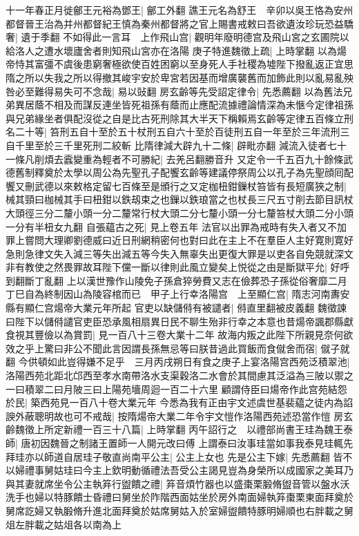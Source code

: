 十一年春正月徙鄶王元裕為鄧王|{
	鄶工外翻}
譙王元名為舒王　辛卯以吳王恪為安州都督晉王治為并州都督紀王慎為秦州都督將之官上賜書戒敕曰吾欲遺汝珍玩恐益驕奢|{
	遺于季翻}
不如得此一言耳　上作飛山宫|{
	觀明年廢明德宫及飛山宮之玄圃院以給洛人之遭水壞廬舍者則知飛山宮亦在洛陽}
庚子特進魏徵上疏|{
	上時掌翻}
以為煬帝恃其富彊不虞後患窮奢極欲使百姓困窮以至身死人手社稷為墟陛下撥亂返正宜思隋之所以失我之所以得撤其峻宇安於卑宮若因基而增廣襲舊而加飾此則以亂易亂殃咎必至難得易失可不念哉|{
	易以䜴翻}
房玄齡等先受詔定律令|{
	先悉薦翻}
以為舊法兄弟異居蔭不相及而謀反連坐皆死祖孫有蔭而止應配流據禮論情深為未愜今定律祖孫與兄弟緣坐者俱配沒從之自是比古死刑除其大半天下稱賴焉玄齡等定律五百條立刑名二十等|{
	笞刑五自十至於五十杖刑五自六十至於百徒刑五自一年至於三年流刑三自千里至於三千里死刑二絞斬}
比隋律減大辟九十二條|{
	辟毗亦翻}
減流入徒者七十一條凡削煩去蠧變重為輕者不可勝紀|{
	去羌呂翻勝音升}
又定令一千五百九十餘條武德舊制釋奠於太學以周公為先聖孔子配饗玄齡等建議停祭周公以孔子為先聖顔囘配饗又刪武德以來敕格定留七百條至是頒行之又定枷杻鉗鏁杖笞皆有長短廣狹之制|{
	械其頸曰枷械其手曰杻鉗以鉄刼束之也鏁以鉄琅當之也杖長三尺五寸削去節目訊杖大頭徑三分二釐小頭一分二釐常行杖大頭二分七釐小頭一分七釐笞杖大頭二分小頭一分有半杻女九翻}
自張藴古之死|{
	見上卷五年}
法官以出罪為戒時有失入者又不加罪上嘗問大理卿劉德威曰近日刑網稍密何也對曰此在主上不在羣臣人主好寛則寛好急則急律文失入減三等失出減五等今失入無辜失出更復大罪是以吏各自免競就深文非有教使之然畏罪故耳陛下儻一斷以律則此風立變矣上悦從之由是斷獄平允|{
	好呼到翻斷丁亂翻}
上以漢世豫作山陵免子孫倉猝勞費又志在儉葬恐子孫從俗奢靡二月丁巳自為終制因山為陵容棺而已　甲子上行幸洛陽宫　上至顯仁宫|{
	隋志河南夀安縣有顯仁宫煬帝大業元年所起}
官吏以缺儲偫有被譴者|{
	偫直里翻被皮義翻}
魏徵諫曰陛下以儲偫譴官吏臣恐承風相扇異日民不聊生殆非行幸之本意也昔煬帝諷郡縣獻食視其豐儉以為賞罰|{
	見一百八十三卷大業十二年}
故海内叛之此陛下所親見奈何欲效之乎上驚曰非公不聞此言因謂長孫無忌等曰朕昔過此買飯而食僦舍而宿|{
	僦子就翻}
今供頓如此豈得嫌不足乎　三月丙戌朔日有食之庚子上宴洛陽宫西苑泛積翠池|{
	洛陽西苑北距北邙西至孝水南帶洛水支渠穀洛二水會於其間慮其泛溢為三陂以禦之一曰積翠二曰月陂三曰上陽苑墻周迴一百二十六里}
顧謂侍臣曰煬帝作此宫苑結怨於民|{
	築西苑見一百八十卷大業元年}
今悉為我有正由宇文述虞世基裴藴之徒内為諂諛外蔽聰明故也可不戒哉|{
	按隋煬帝大業二年令宇文愷作洛陽西苑述恐當作愷}
房玄齡魏徵上所定新禮一百三十八篇|{
	上時掌翻}
丙午詔行之　以禮部尚書王珪為魏王泰師|{
	唐初因魏晉之制諸王置師一人開元改曰傅}
上謂泰曰汝事珪當如事我泰見珪輒先拜珪亦以師道自居珪子敬直尚南平公主|{
	公主上女也}
先是公主下嫁|{
	先悉薦翻}
皆不以婦禮事舅姑珪曰今主上欽明動循禮法吾受公主謁見豈為身榮所以成國家之美耳乃與其妻就席坐令公主執笲行盥饋之禮|{
	笲音煩竹器也以盛棗栗腶脩盥音管以盤水沃洗手也婦以特豚饋士昏禮曰舅坐於阼階西面姑坐於房外南面婦執笲棗栗東面拜奠於舅席訖婦又執腶脩升進北面拜奠於姑席舅姑入於室婦盥饋特豚明婦順也右胖載之舅俎左胖載之姑俎各以南為上}
